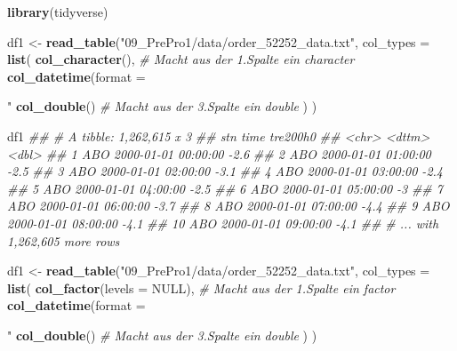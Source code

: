 \documentclass[]{book}
\newenvironment{Shaded}{\begin{snugshade}}{\end{snugshade}}
\newcommand{\CommentTok}[1]{\textcolor[rgb]{0.56,0.35,0.01}{\textit{#1}}}
\newcommand{\DataTypeTok}[1]{\textcolor[rgb]{0.13,0.29,0.53}{#1}}
\newcommand{\KeywordTok}[1]{\textcolor[rgb]{0.13,0.29,0.53}{\textbf{#1}}}
\newcommand{\NormalTok}[1]{#1}
\newcommand{\OtherTok}[1]{\textcolor[rgb]{0.56,0.35,0.01}{#1}}
\newcommand{\StringTok}[1]{\textcolor[rgb]{0.31,0.60,0.02}{#1}}
\begin{document}
\begin{Shaded}
\begin{Highlighting}[]

\KeywordTok{library}\NormalTok{(tidyverse)}

\NormalTok{df1 <-}\StringTok{ }\KeywordTok{read_table}\NormalTok{(}\StringTok{"09_PrePro1/data/order_52252_data.txt"}\NormalTok{,}
                  \DataTypeTok{col_types =} \KeywordTok{list}\NormalTok{(}
                    \KeywordTok{col_character}\NormalTok{(),                  }\CommentTok{# Macht aus der 1.Spalte ein character}
                    \KeywordTok{col_datetime}\NormalTok{(}\DataTypeTok{format =} \StringTok{"%
                    \KeywordTok{col_double}\NormalTok{()                      }\CommentTok{# Macht aus der 3.Spalte ein double}
\NormalTok{                    )}
\NormalTok{                  )}

\NormalTok{df1}
\CommentTok{## # A tibble: 1,262,615 x 3}
\CommentTok{##    stn   time                tre200h0}
\CommentTok{##    <chr> <dttm>                 <dbl>}
\CommentTok{##  1 ABO   2000-01-01 00:00:00     -2.6}
\CommentTok{##  2 ABO   2000-01-01 01:00:00     -2.5}
\CommentTok{##  3 ABO   2000-01-01 02:00:00     -3.1}
\CommentTok{##  4 ABO   2000-01-01 03:00:00     -2.4}
\CommentTok{##  5 ABO   2000-01-01 04:00:00     -2.5}
\CommentTok{##  6 ABO   2000-01-01 05:00:00     -3  }
\CommentTok{##  7 ABO   2000-01-01 06:00:00     -3.7}
\CommentTok{##  8 ABO   2000-01-01 07:00:00     -4.4}
\CommentTok{##  9 ABO   2000-01-01 08:00:00     -4.1}
\CommentTok{## 10 ABO   2000-01-01 09:00:00     -4.1}
\CommentTok{## # ... with 1,262,605 more rows}

\NormalTok{df1 <-}\StringTok{ }\KeywordTok{read_table}\NormalTok{(}\StringTok{"09_PrePro1/data/order_52252_data.txt"}\NormalTok{,}
                  \DataTypeTok{col_types =} \KeywordTok{list}\NormalTok{(}
                    \KeywordTok{col_factor}\NormalTok{(}\DataTypeTok{levels =} \OtherTok{NULL}\NormalTok{),        }\CommentTok{# Macht aus der 1.Spalte ein factor}
                    \KeywordTok{col_datetime}\NormalTok{(}\DataTypeTok{format =} \StringTok{"%
                    \KeywordTok{col_double}\NormalTok{()                      }\CommentTok{# Macht aus der 3.Spalte ein double}
\NormalTok{                    )}
\NormalTok{                  )}


}}
\end{Highlighting}
\end{Shaded}
\end{document}
